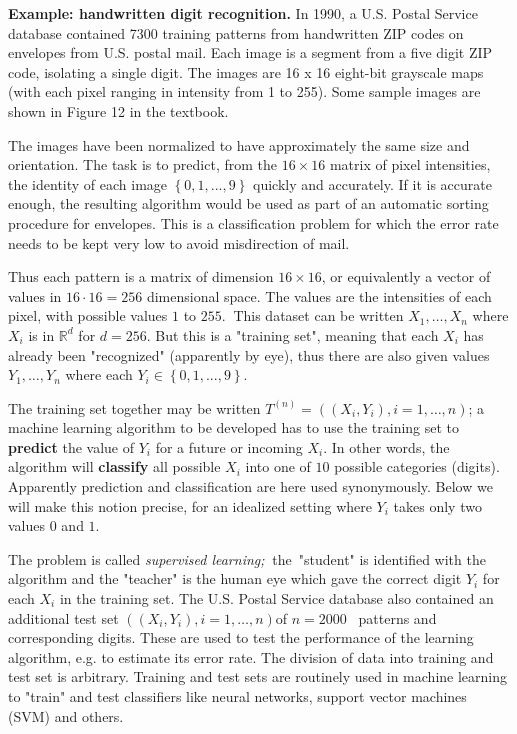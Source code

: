\documentclass[11pt,twoside]{article}%
\theoremstyle{change}
\begin{document}
\textbf{Example: handwritten digit recognition.} In 1990, a U.S. Postal
Service database contained 7300 training patterns from handwritten ZIP codes
on envelopes from U.S. postal mail. Each image is a segment from a five digit
ZIP code, isolating a single digit. The images are 16 x 16 eight-bit grayscale
maps (with each pixel ranging in intensity from 1 to 255). Some sample images
are shown in Figure 12 in the textbook.

The images have been normalized to have approximately the same size and
orientation. The task is to predict, from the $16\times16$ matrix of pixel
intensities, the identity of each image $\left\{  0,1,...,9\right\}  $ quickly
and accurately. If it is accurate enough, the resulting algorithm would be
used as part of an automatic sorting procedure for envelopes. This is a
classification problem for which the error rate needs to be kept very low to
avoid misdirection of mail.

Thus each pattern is a matrix of dimension $16\times16$, or equivalently a
vector of values in $16\cdot16=256$ dimensional space. The values are the
intensities of each pixel, with possible values $1$ to $255$. $\ $This dataset
can be written $X_{1},\ldots,X_{n}$ where $X_{i}$ is in $\mathbb{R}^{d}$ for
$d=256$. But this is a "training set", meaning that each $X_{i}$ has already
been "recognized" (apparently by eye), thus there are also given values
$Y_{1},\ldots,Y_{n}$ where each $Y_{i}\in\left\{  0,1,...,9\right\}  $.

The training set together may be written $T^{(n)}=\left(  \left(  X_{i}%
,Y_{i}\right)  ,i=1,\ldots,n\right)  $; a machine learning algorithm to be
developed has to use the training set to \textbf{predict} the value of $Y_{i}$
for a future or incoming $X_{i}.$ In other words, the algorithm will
\textbf{classify} all possible $X_{i}$ into one of $10$ possible categories
(digits). Apparently prediction and classification are here used synonymously.
Below we will make this notion precise, for an idealized setting where $Y_{i}$
takes only two values $0$ and $1.$

The problem is called \textit{supervised learning; }$\ $the\ "student" is
identified with the algorithm and the "teacher" is the human eye which gave
the correct digit $Y_{i}$ for each $X_{i}$ in the training set. The U.S.
Postal Service database also contained an additional test set $\left(  \left(
X_{i},Y_{i}\right)  ,i=1,\ldots,n\right)  $of $n=2000$ \ patterns and
corresponding digits. These are used to test the performance of the learning
algorithm, e.g. to estimate its error rate. The division of data into training
and test set is arbitrary. Training and test sets are routinely used in
machine learning to "train" and test classifiers like neural networks, support
vector machines (SVM) and others.
\end{document}
